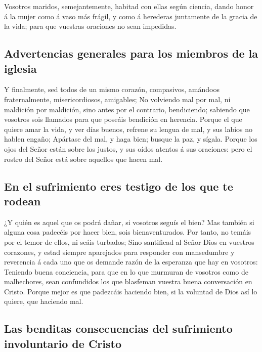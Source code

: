  Vosotros maridos, semejantemente, habitad con ellas según
ciencia, dando honor á la mujer como á vaso más frágil, y como á
herederas juntamente de la gracia de la vida; para que vuestras
oraciones no sean impedidas.

\hypertarget{advertencias-generales-para-los-miembros-de-la-iglesia}{%
\subsection{Advertencias generales para los miembros de la
iglesia}\label{advertencias-generales-para-los-miembros-de-la-iglesia}}

 Y finalmente, sed todos de un mismo corazón, compasivos,
amándoos fraternalmente, misericordiosos, amigables;  No
volviendo mal por mal, ni maldición por maldición, sino antes por el
contrario, bendiciendo; sabiendo que vosotros sois llamados para que
poseáis bendición en herencia.  Porque el que quiere amar
la vida, y ver días buenos, refrene su lengua de mal, y sus labios no
hablen engaño;  Apártase del mal, y haga bien; busque la
paz, y sígala.  Porque los ojos del Señor están sobre los
justos, y sus oídos atentos á sus oraciones: pero el rostro del Señor
está sobre aquellos que hacen mal.

\hypertarget{en-el-sufrimiento-eres-testigo-de-los-que-te-rodean}{%
\subsection{En el sufrimiento eres testigo de los que te
rodean}\label{en-el-sufrimiento-eres-testigo-de-los-que-te-rodean}}

 ¿Y quién es aquel que os podrá dañar, si vosotros seguís
el bien?  Mas también si alguna cosa padecéis por hacer
bien, sois bienaventurados. Por tanto, no temáis por el temor de ellos,
ni seáis turbados;  Sino santificad al Señor Dios en
vuestros corazones, y estad siempre aparejados para responder con
mansedumbre y reverencia á cada uno que os demande razón de la esperanza
que hay en vosotros:  Teniendo buena conciencia, para que
en lo que murmuran de vosotros como de malhechores, sean confundidos los
que blasfeman vuestra buena conversación en Cristo. 
Porque mejor es que padezcáis haciendo bien, si la voluntad de Dios así
lo quiere, que haciendo mal.

\hypertarget{las-benditas-consecuencias-del-sufrimiento-involuntario-de-cristo}{%
\subsection{Las benditas consecuencias del sufrimiento involuntario de
Cristo}\label{las-benditas-consecuencias-del-sufrimiento-involuntario-de-cristo}}

